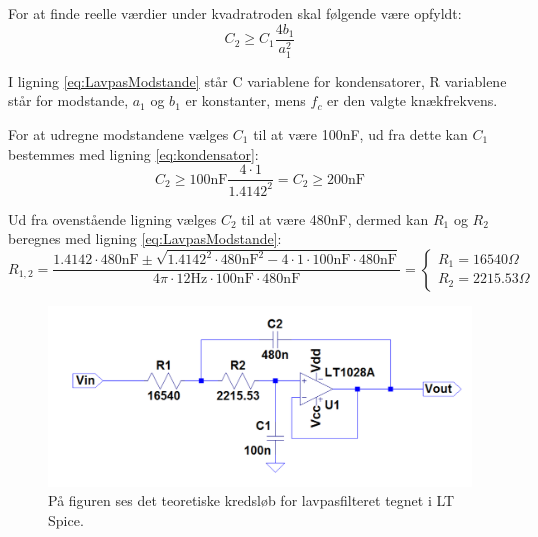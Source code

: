For at finde reelle værdier under kvadratroden skal følgende være opfyldt:
\begin{equation} \label{eq:kondensator}
C_2 \geq C_1 \frac{4b_1}{a_1^2}
\end{equation}

I ligning \ref{eq:LavpasModstande} står C variablene for kondensatorer, R variablene står for modstande, $a_1$ og $b_1$ er konstanter, mens $f_c$ er den valgte knækfrekvens. 

For at udregne modstandene vælges $C_1$ til at være 100nF, ud fra dette kan $C_1$ bestemmes med ligning \ref{eq:kondensator}:
\begin{equation}
C_2 \geq 100\text{nF} \frac{4\cdot 1}{1.4142^2} = C_2 \geq 200\text{nF}
\end{equation}

Ud fra ovenstående ligning vælges $C_2$ til at være 480nF, dermed kan $R_1$ og $R_2$ beregnes med ligning \ref{eq:LavpasModstande}:
\begin{equation}
R_{1,2} = \frac{1.4142 \cdot 480\text{nF} \pm \sqrt{1.4142^2 \cdot 480\text{nF}^2 - 4 \cdot 1 \cdot 100\text{nF} \cdot 480\text{nF}}}{4 \pi \cdot 12\text{Hz} \cdot 100\text{nF} \cdot 480\text{nF}} = \begin{cases} R_{1} = 16540 \Omega \\ R_{2} = 2215.53 \Omega \end{cases}
\end{equation}

\begin{figure}[H]
	\centering
	\includegraphics[scale=0.6]{figures/cProblemloesning/Lavpasfilter_teoretisk.PNG}
	\caption{På figuren ses det teoretiske kredsløb for lavpasfilteret tegnet i LT Spice.}
	\label{fig:lavpasfilter_teoretisk}
\end{figure}
